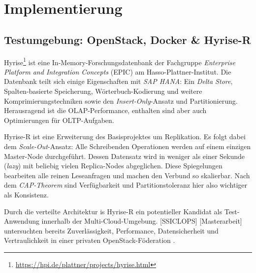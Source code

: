 \chapter{Implementierung}

\section{Testumgebung: OpenStack, Docker \& Hyrise-R}

Hyrise\footnote{\url{https://hpi.de/plattner/projects/hyrise.html}} ist eine In-Memory-Forschungsdatenbank der Fachgruppe \emph{Enterprise Platform and Integration Concepts} (EPIC) am Hasso-Plattner-Institut. Die Datenbank teilt sich einige Eigenschaften mit \emph{SAP HANA}: Ein \emph{Delta Store}, Spalten-basierte Speicherung, Wörterbuch-Kodierung und weitere Komprimierungstechniken sowie den \emph{Insert-Only}-Ansatz und Partitionierung. Herausragend ist die OLAP-Performance, enthalten sind aber auch Optimierungen für OLTP-Aufgaben.


Hyrise-R ist eine Erweiterung des Basisprojektes um Replikation. Es folgt dabei dem \emph{Scale-Out}-Ansatz: Alle Schreibenden Operationen werden auf einem einzigen Master-Node durchgeführt. Dessen Datensatz wird in weniger als einer Sekunde (\emph{lazy}) mit beliebig vielen Replica-Nodes abgeglichen. Diese Spiegelungen bearbeiten alle reinen Leseanfragen und machen den Verbund so skalierbar. Nach dem \emph{CAP-Theorem} sind Verfügbarkeit und Partitionstoleranz hier also wichtiger als Konsistenz.

Durch die verteilte Architektur is Hyrise-R ein potentieller Kandidat als Test-Anwendung innerhalb der Multi-Cloud-Umgebung. [SSICLOPS] [Masterarbeit] untersuchten bereits Zuverlässigkeit, Performance, Datensicherheit und Vertraulichkeit in einer privaten OpenStack-Föderation . 

